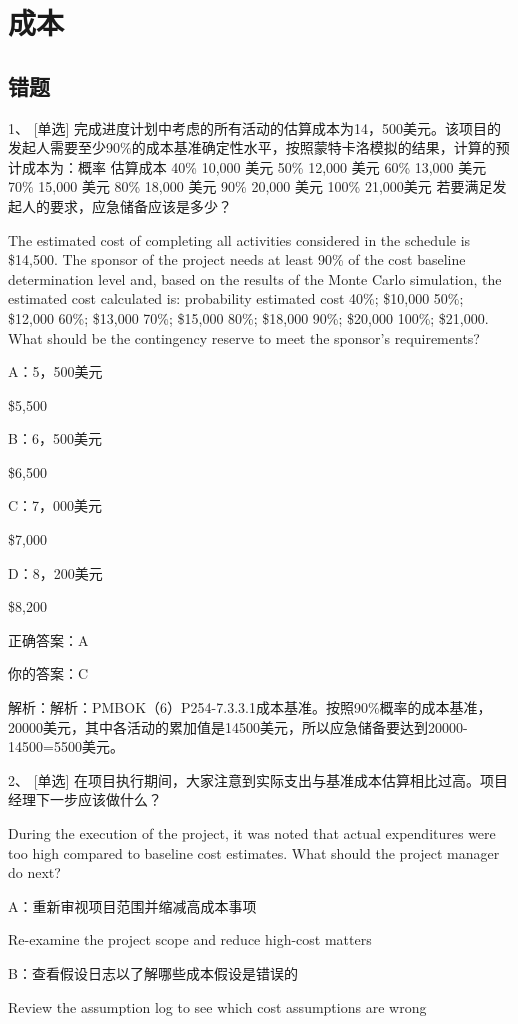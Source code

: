 
\chapter{成本}

\section{错题}
1、 [单选] 完成进度计划中考虑的所有活动的估算成本为14，500美元。该项目的发起人需要至少90\%的成本基准确定性水平，按照蒙特卡洛模拟的结果，计算的预计成本为：概率 估算成本 40\% 10,000 美元 50\% 12,000 美元 60\% 13,000 美元 70\% 15,000 美元 80\% 18,000 美元 90\% 20,000 美元 100\% 21,000美元 若要满足发起人的要求，应急储备应该是多少？

The estimated cost of completing all activities considered in the schedule is \$14,500. The sponsor of the project needs at least 90\% of the cost baseline determination level and, based on the results of the Monte Carlo simulation, the estimated cost calculated is: probability estimated cost 40\%; \$10,000 50\%; \$12,000 60\%; \$13,000 70\%; \$15,000 80\%; \$18,000 90\%; \$20,000 100\%; \$21,000. What should be the contingency reserve to meet the sponsor's requirements?

A：5，500美元

\$5,500

B：6，500美元

\$6,500

C：7，000美元

\$7,000

D：8，200美元

\$8,200

正确答案：A

你的答案：C

解析：解析：PMBOK（6）P254-7.3.3.1成本基准。按照90\%概率的成本基准，20000美元，其中各活动的累加值是14500美元，所以应急储备要达到20000-14500=5500美元。


2、 [单选] 在项目执行期间，大家注意到实际支出与基准成本估算相比过高。项目经理下一步应该做什么？

During the execution of the project, it was noted that actual expenditures were too high compared to baseline cost estimates. What should the project manager do next?

A：重新审视项目范围并缩减高成本事项

Re-examine the project scope and reduce high-cost matters

B：查看假设日志以了解哪些成本假设是错误的

Review the assumption log to see which cost assumptions are wrong

